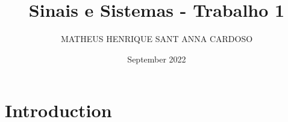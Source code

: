\documentclass{article}
\title{Sinais e Sistemas - Trabalho 1}
\author{MATHEUS HENRIQUE SANT ANNA CARDOSO}
\date{September 2022}
\begin{document}
\maketitle

\section{Introduction}
\end{document}
